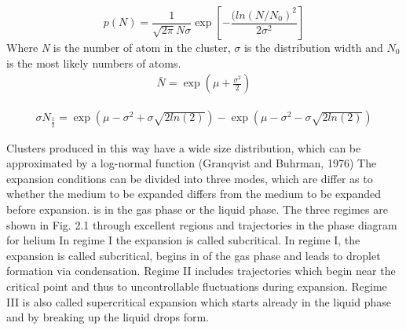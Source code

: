 \begin{equation}
p(N) = \frac{1}{\sqrt{2\pi}N \sigma} \exp  \left[- \frac{(ln(N/N_{0})^2}{2\sigma^2} \right]
\end{equation}
Where \textit{N} is the number of atom in the cluster, $\sigma$ is the distribution width and \textit{$N_{0}$} is the most likely numbers of atoms.
\begin{align}
\bar N = \exp  \left(\mu+\frac{\sigma^2}{2} \right)
\end{align}

\begin{align}
\sigma N_{\frac{1}{2}} = \exp \left( \mu - \sigma ^2 + \sigma \sqrt{2 ln(2)} \right) - \exp \left(  \mu - \sigma ^2 - \sigma \sqrt{2 ln(2)}  \right)
\end{align}

Clusters produced in this way have a wide size distribution, which can be
approximated by a log-normal function (Granqvist and Buhrman, 1976) 
The expansion conditions can be divided into three modes, which are
differ as to whether the medium to be expanded differs from the medium to be expanded before expansion.
is in the gas phase or the liquid phase. The three regimes are shown in Fig.
2.1 through excellent regions and trajectories in the phase diagram for helium
In regime I the expansion is called subcritical. In regime I, the expansion is called subcritical, begins in
of the gas phase and leads to droplet formation via condensation. Regime II
includes trajectories which begin near the critical point and thus to
uncontrollable fluctuations during expansion. Regime III is
also called supercritical expansion which starts already in the liquid phase
and by breaking up the liquid drops form.
